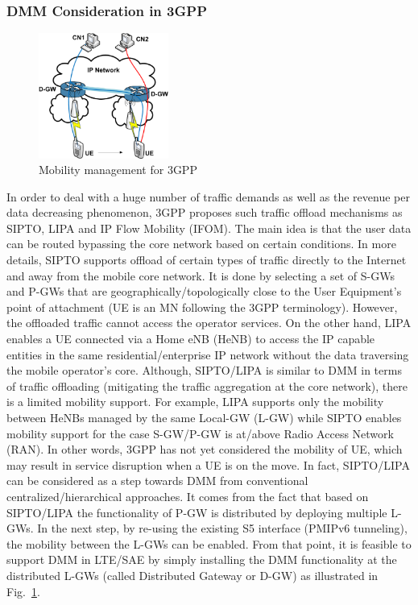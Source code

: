 \subsubsection{DMM Consideration in 3GPP}
\begin{figure}[h!]
\centering
\includegraphics[width=0.38\textwidth]{./Part1/Chapter2/figures/c3_dmm_3gpp.eps}
\caption[Mobility management for 3GPP.]{Mobility management for 3GPP}
\label{fig:c3_dmm_3gpp}
\end{figure}

In order to deal with a huge number of traffic demands as well as the revenue per data decreasing phenomenon, 3GPP proposes such traffic offload mechanisms as SIPTO, LIPA and IP Flow Mobility (IFOM). The main idea is that the user data can be routed bypassing the core network based on certain conditions. In more details, SIPTO supports offload of certain types of traffic directly to the Internet and away from the mobile core network. It is done by selecting a set of S-GWs and P-GWs that are geographically/topologically close to the User Equipment's point of attachment (UE is an MN following the 3GPP terminology). However, the offloaded traffic cannot access the operator services. On the other hand, LIPA enables a UE connected via a Home eNB (HeNB) to access the IP capable entities in the same residential/enterprise IP network without the data traversing the mobile operator’s core. Although, SIPTO/LIPA is similar to DMM in terms of traffic offloading (mitigating the traffic aggregation at the core network), there is a limited mobility support. For example, LIPA supports only the mobility between HeNBs managed by the same Local-GW (L-GW) while SIPTO enables mobility support for the case S-GW/P-GW is at/above Radio Access Network (RAN). In other words, 3GPP has not yet considered the mobility of UE, which may result in service disruption when a UE is on the move. In fact, SIPTO/LIPA can be considered as a step towards DMM from conventional centralized/hierarchical approaches. It comes from the fact that based on SIPTO/LIPA the functionality of P-GW is distributed by deploying multiple L-GWs. In the next step, by re-using the existing S5 interface (PMIPv6 tunneling), the mobility between the L-GWs can be enabled. From that point, it is feasible to support DMM in LTE/SAE by simply installing the DMM functionality at the distributed L-GWs (called Distributed Gateway or D-GW) as illustrated in Fig.~\ref{fig:c3_dmm_3gpp}. 

